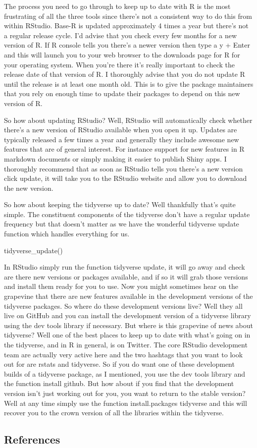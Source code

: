 \documentclass[
]{article}
\newenvironment{Shaded}{\begin{snugshade}}{\end{snugshade}}
\newcommand{\FunctionTok}[1]{\textcolor[rgb]{0.00,0.00,0.00}{#1}}
\newcommand{\NormalTok}[1]{#1}
\begin{document}
The process you need to go through to keep up to date with R is the most frustrating of all the three tools since there's not a consistent way to do this from within RStudio. Base-R is updated approximately 4 times a year but there's not a regular release cycle. I'd advise that you check every few months for a new version of R. If R console tells you there's a newer version then type a y + Enter and this will launch you to your web browser to the downloads page for R for your operating system. When you're there it's really important to check the release date of that version of R. I thoroughly advise that you do not update R until the release is at least one month old. This is to give the package maintainers that you rely on enough time to update their packages to depend on this new version of R.

So how about updating RStudio? Well, RStudio will automatically check whether there's a new version of RStudio available when you open it up. Updates are typically released a few times a year and generally they include awesome new features that are of general interest. For instance support for new features in R markdown documents or simply making it easier to publish Shiny apps. I thoroughly recommend that as soon as RStudio tells you there's a new version click update, it will take you to the RStudio website and allow you to download the new version.

So how about keeping the tidyverse up to date? Well thankfully that's quite simple. The constituent components of the tidyverse don't have a regular update frequency but that doesn't matter as we have the wonderful tidyverse update function which handles everything for us.

\begin{Shaded}
\begin{Highlighting}[]
\FunctionTok{tidyverse\_update}\NormalTok{()}
\end{Highlighting}
\end{Shaded}

In RStudio simply run the function tidyverse update, it will go away and check are there new versions or packages available, and if so it will grab those versions and install them ready for you to use. Now you might sometimes hear on the grapevine that there are new features available in the development versions of the tidyverse packages. So where do these development versions live? Well they all live on GitHub and you can install the development version of a tidyverse library using the dev tools library if necessary. But where is this grapevine of news about tidyverse? Well one of the best places to keep up to date with what's going on in the tidyverse, and in R in general, is on Twitter. The core RStudio development team are actually very active here and the two hashtags that you want to look out for are rstats and tidyverse. So if you do want one of these development builds of a tidyverse package, as I mentioned, you use the dev tools library and the function install github. But how about if you find that the development version isn't just working out for you, you want to return to the stable version? Well at any time simply use the function install.packages tidyverse and this will recover you to the crown version of all the libraries within the tidyverse.

\hypertarget{references}{%
\subsection{References}\label{references}}
\end{document}
